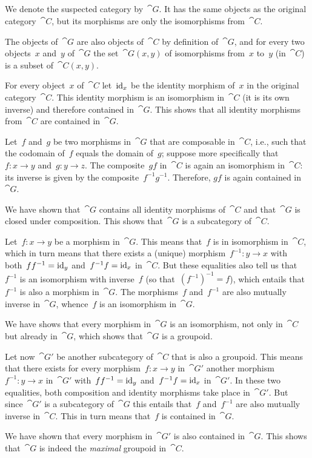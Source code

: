 \subsection{}

We denote the suspected category by~$\cat{G}$.
It has the same objects as the original category~$\cat{C}$, but its morphisms are only the isomorphisms from~$\cat{C}$.

The objects of~$\cat{G}$ are also objects of~$\cat{C}$ by definition of~$\cat{G}$, and for every two objects~$x$ and~$y$ of~$\cat{G}$ the set~$\cat{G}(x, y)$ of isomorphisms from~$x$ to~$y$ (in~$\cat{C}$) is a subset of~$\cat{C}(x, y)$.

For every object~$x$ of~$\cat{C}$ let~$\operatorname{id}_x$ be the identity morphism of~$x$ in the original category~$\cat{C}$.
This identity morphism is an isomorphism in~$\cat{C}$ (it is its own inverse) and therefore contained in~$\cat{G}$.
This shows that all identity morphisms from~$\cat{C}$ are contained in~$\cat{G}$.

Let~$f$ and~$g$ be two morphisms in~$\cat{G}$ that are composable in~$\cat{C}$, i.e., such that the codomain of~$f$ equals the domain of~$g$;
suppose more specifically that~$f \colon x \to y$ and~$g \colon y \to z$.
The composite~$g f$ in~$\cat{C}$ is again an isomorphism in~$\cat{C}$:
its inverse is given by the composite~$f^{-1} g^{-1}$.
Therefore, $g f$ is again contained in~$\cat{G}$.

We have shown that~$\cat{G}$ contains all identity morphisms of~$\cat{C}$ and that~$\cat{G}$ is closed under composition.
This shows that~$\cat{G}$ is a subcategory of~$\cat{C}$.

Let~$f \colon x \to y$ be a morphism in~$\cat{G}$.
This means that~$f$ is in isomorphism in~$\cat{C}$, which in turn means that there exists a (unique) morphism~$f^{-1} \colon y \to x$ with both~$f f^{-1} = \operatorname{id}_y$ and~$f^{-1} f = \operatorname{id}_x$ in~$\cat{C}$.
But these equalities also tell us that~$f^{-1}$ is an isomorphism with inverse~$f$ (so that~$(f^{-1})^{-1} = f$), which entails that~$f^{-1}$ is also a morphism in~$\cat{G}$.
The morphisms~$f$ and~$f^{-1}$ are also mutually inverse in~$\cat{G}$, whence~$f$ is an isomorphism in~$\cat{G}$.

We have shows that every morphism in~$\cat{G}$ is an isomorphism, not only in~$\cat{C}$ but already in~$\cat{G}$, which shows that~$\cat{G}$ is a groupoid.

Let now~$\cat{G}'$ be another subcategory of~$\cat{C}$ that is also a groupoid.
This means that there exists for every morphism~$f \colon x \to y$ in~$\cat{G}'$ another morphism~$f^{-1} \colon y \to x$ in~$\cat{G}'$ with~$f f^{-1} = \operatorname{id}_y$ and~$f^{-1} f = \operatorname{id}_x$ in~$\cat{G}'$.
In these two equalities, both composition and identity morphisms take place in~$\cat{G}'$.
But since~$\cat{G}'$ is a subcategory of~$\cat{G}$ this entails that~$f$ and~$f^{-1}$ are also mutually inverse in~$\cat{C}$.
This in turn means that~$f$ is contained in~$\cat{G}$.

We have shown that every morphism in~$\cat{G}'$ is also contained in~$\cat{G}$.
This shows that~$\cat{G}$ is indeed the \emph{maximal} groupoid in~$\cat{C}$.
